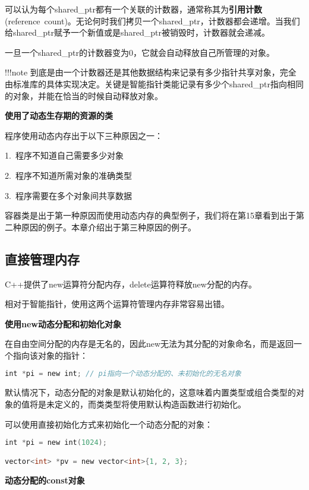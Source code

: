 \documentclass[
  a4paper,
  oneside,tablecaptionabove
]{scrbook}
\begin{document}
可以认为每个shared\_ptr都有一个关联的计数器，通常称其为\textbf{引用计数}(reference~count)。无论何时我们拷贝一个shared\_ptr，计数器都会递增。当我们给shared\_ptr赋予一个新值或是shared\_ptr被销毁时，计数器就会递减。

一旦一个shared\_ptr的计数器变为0，它就会自动释放自己所管理的对象。

!!!note
到底是由一个计数器还是其他数据结构来记录有多少指针共享对象，完全由标准库的具体实现决定。关键是智能指针类能记录有多少个shared\_ptr指向相同的对象，并能在恰当的时候自动释放对象。

\textbf{使用了动态生存期的资源的类}

程序使用动态内存出于以下三种原因之一：

1.~程序不知道自己需要多少对象

2.~程序不知道所需对象的准确类型

3.~程序需要在多个对象间共享数据

容器类是出于第一种原因而使用动态内存的典型例子，我们将在第15章看到出于第二种原因的例子。本章介绍出于第三种原因的例子。

\subsection{直接管理内存}\label{ux76f4ux63a5ux7ba1ux7406ux5185ux5b58}

C++提供了new运算符分配内存，delete运算符释放new分配的内存。

相对于智能指针，使用这两个运算符管理内存非常容易出错。

\textbf{使用new动态分配和初始化对象}

在自由空间分配的内存是无名的，因此new无法为其分配的对象命名，而是返回一个指向该对象的指针：

\begin{lstlisting}[language={C++}]
int *pi = new int; // pi指向一个动态分配的、未初始化的无名对象
\end{lstlisting}

默认情况下，动态分配的对象是默认初始化的，这意味着内置类型或组合类型的对象的值将是未定义的，而类类型将使用默认构造函数进行初始化。

可以使用直接初始化方式来初始化一个动态分配的对象：

\begin{lstlisting}[language={C++}]
int *pi = new int(1024);

vector<int> *pv = new vector<int>{1, 2, 3};
\end{lstlisting}

\textbf{动态分配的const对象}
\end{document}
